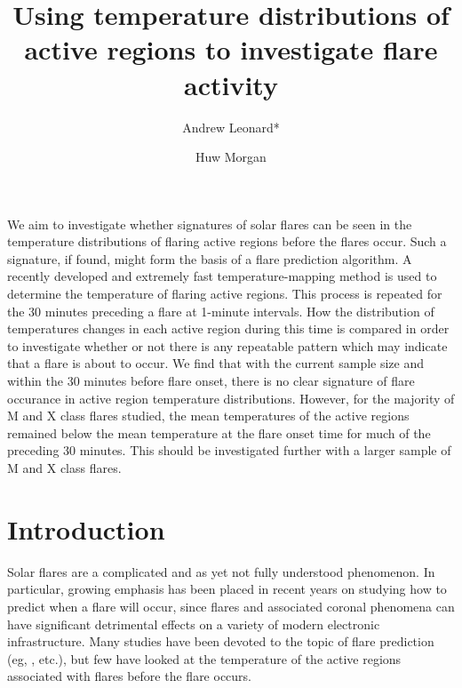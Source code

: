\documentclass[referee,a4paper,12pt]{swsc}
\author{Andrew Leonard*
        \and Huw Morgan}
\institute{Institute of Mathematics, Physics and Computer Science, Aberystwyth University, Ceredigion, SY23 3BZ, Wales\\
					 \email{\href{mailto:ajl7@aber.ac.uk}{ajl7@aber.ac.uk}}}
\title{Using temperature distributions of active regions to investigate flare activity}
\begin{document}
\begin{linenumbers}


\abstract
	{}
	{We aim to investigate whether signatures of solar flares can be seen in the temperature distributions of flaring active regions before the flares occur. Such a signature, if found, might form the basis of a flare prediction algorithm.}
	{A recently developed and extremely fast temperature-mapping method is used to determine the temperature of flaring active regions. This process is repeated for the 30 minutes preceding a flare at 1-minute intervals. How the distribution of temperatures changes in each active region during this time is compared in order to investigate whether or not there is any repeatable pattern which may indicate that a flare is about to occur.}
	{We find that with the current sample size and within the 30 minutes before flare onset, there is no clear signature of flare occurance in active region temperature distributions. However, for the majority of M and X class flares studied, the mean temperatures of the active regions remained below the mean temperature at the flare onset time for much of the preceding 30 minutes. This should be investigated further with a larger sample of M and X class flares.}
	{}

\maketitle

\section{Introduction}
Solar flares are a complicated and as yet not fully understood phenomenon.
In particular, growing emphasis has been placed in recent years on studying how to predict when a flare will occur, since flares and associated coronal phenomena can have significant detrimental effects on a variety of modern electronic infrastructure. %
Many studies have been devoted to the topic of flare prediction (eg, \citealt{Korsos2014, Ahmed2011, Bloomfield2012}, etc.), but few have looked at the temperature of the active regions associated with flares before the flare occurs. %


\end{linenumbers}
\end{document}
